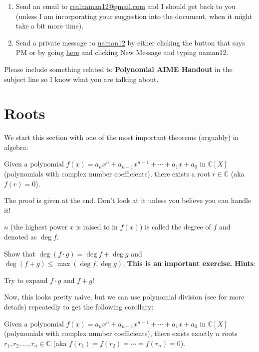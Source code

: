 \documentclass[11pt,titlepage]{scrartcl}
\newenvironment{hint}{\footnotesize \normalfont \textbf{Hints}:}{\hspace{-0.5ex}}
\begin{document}
\begin{enumerate}
    \item Send an email to \href{mailto:realnaman12@gmail.com}{realnaman12@gmail.com} and I should get back to you (unless I am incorporating your suggestion into the document, when it might take a bit more time).
    \item Send a private message to \href{https://artofproblemsolving.com/community/user/311437}{naman12} by either clicking the button that says PM or by going \href{https://artofproblemsolving.com/community/my-messages}{here} and clicking New Message and typing naman12.
\end{enumerate}
Please include something related to \textbf{Polynomial AIME Handout} in the subject line so I know what you are talking about.
\section{Roots}
We start this section with one of the most important theorems (arguably) in algebra:
\begin{theorem}\label{ftal}
Given a polynomial $f(x) = a_nx^n +a_{n-1}x^{n-1}+\cdots+a_1x+a_0$ in $\mathbb C[X]$ (polynomials with complex number coefficients), there exists a root $r\in\mathbb C$ (aka $f(r)=0$).
\end{theorem}
\begin{remark}
The proof is given at the end. Don't look at it unless you believe you can handle it!
\end{remark}
\begin{remark}
$n$ (the highest power $x$ is raised to in $f(x)$) is called the degree of $f$ and denoted as $\deg f$.
\end{remark}
\begin{exercisebox}
\begin{exercise}
Show that $\deg (f\cdot g)=\deg f+\deg g$ and $\deg (f+g)\leq \max(\deg f,\deg g)$. \textbf{This is an important exercise.}
\begin{hint}
\begin{addhint}{
Try to expand  $f\cdot g$ and $f+g$!
}\end{addhint}
\end{hint}
\end{exercise}
\end{exercisebox}
Now, this looks pretty naive, but we can use polynomial division (see  for more details) repeatedly to get the following corollary:
\begin{corollary}\label{nrcor}
Given a polynomial $f(x) = a_nx^n +a_{n-1}x^{n-1}+\cdots+a_1x+a_0$ in $\mathbb C[X]$ (polynomials with complex number coefficients), there exists exactly $n$ roots $r_1,r_2,\ldots,r_n\in\mathbb C$ (aka $f(r_1)=f(r_2)=\cdots=f(r_n)=0$).
\end{corollary}
\end{document}
